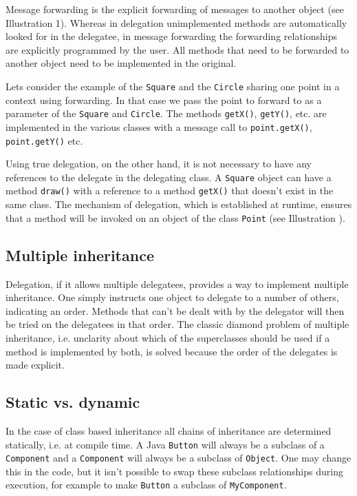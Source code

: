 \documentclass[a4paper,12pt]{book}
\begin{document}
Message forwarding is the explicit forwarding of messages to another object (see Illustration 1). Whereas in delegation unimplemented methods are automatically looked for in the delegatee, in message forwarding the forwarding relationships are explicitly programmed by the user. All methods that need to be forwarded to another object need to be implemented in the original.

Lets consider the example of the \verb|Square| and the \verb|Circle| sharing one point in a context using forwarding. In that case we pass the point to forward to as a parameter of the \verb|Square| and \verb|Circle|. The methods \verb|getX()|, \verb|getY()|, etc. are implemented in the various classes with a message call to \verb|point.getX()|, \verb|point.getY()| etc.

Using true delegation, on the other hand, it is not necessary to have any references to the delegate in the delegating class. A \verb|Square| object can have a method \verb|draw()| with a reference to a method \verb|getX()| that doesn't exist in the same class. The mechanism of delegation, which is established at runtime, ensures that a method will be invoked on an object of the class \verb|Point| (see Illustration ).

\subsection*{Multiple inheritance}
Delegation, if it allows multiple delegatees, provides a way to implement multiple inheritance. One simply instructs one object to delegate to a number of others, indicating an order. Methods that can't be dealt with by the delegator will then be tried on the delegatees in that order. The classic diamond problem of multiple inheritance, i.e. unclarity about which of the superclasses should be used if a method is implemented by both, is solved because the order of the delegates is made explicit.

\subsection*{Static vs. dynamic}
In the case of class based inheritance all chains of inheritance are determined statically, i.e. at compile time. A Java \verb|Button| will always be a subclass of a \verb|Component| and a \verb|Component| will always be a subclass of \verb|Object|. One may change this in the code, but it isn't possible to swap these subclass relationships during execution, for example to make \verb|Button| a subclass of \verb|MyComponent|.
\end{document}
